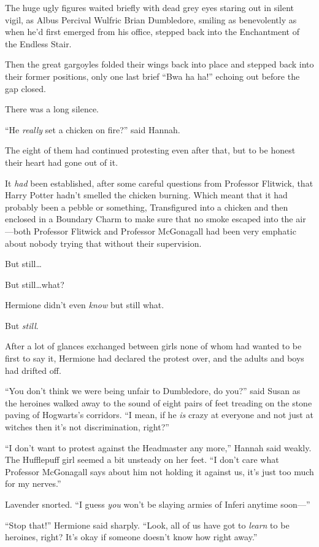 The huge ugly figures waited briefly with dead grey eyes staring out in silent vigil, as Albus Percival Wulfric Brian Dumbledore, smiling as benevolently as when he’d first emerged from his office, stepped back into the Enchantment of the Endless Stair.

Then the great gargoyles folded their wings back into place and stepped back into their former positions, only one last brief “Bwa ha ha!” echoing out before the gap closed.

There was a long silence.

“He \emph{really} set a chicken on fire?” said Hannah.

\later

The eight of them had continued protesting even after that, but to be honest their heart had gone out of it.

It \emph{had} been established, after some careful questions from Professor Flitwick, that Harry Potter hadn’t smelled the chicken burning. Which meant that it had probably been a pebble or something, Transfigured into a chicken and then enclosed in a Boundary Charm to make sure that no smoke escaped into the air—both Professor Flitwick and Professor McGonagall had been very emphatic about nobody trying that without their supervision.

But still…

But still…what?

Hermione didn’t even \emph{know} but still what.

But \emph{still}.

After a lot of glances exchanged between girls none of whom had wanted to be first to say it, Hermione had declared the protest over, and the adults and boys had drifted off.

“You don’t think we were being unfair to Dumbledore, do you?” said Susan as the heroines walked away to the sound of eight pairs of feet treading on the stone paving of Hogwarts’s corridors. “I mean, if he \emph{is} crazy at everyone and not just at witches then it’s not discrimination, right?”

“I don’t want to protest against the Headmaster any more,” Hannah said weakly. The Hufflepuff girl seemed a bit unsteady on her feet. “I don’t care what Professor McGonagall says about him not holding it against us, it’s just too much for my nerves.”

Lavender snorted. “I guess \emph{you} won’t be slaying armies of Inferi anytime soon—”

“Stop that!” Hermione said sharply. “Look, all of us have got to \emph{learn} to be heroines, right? It’s okay if someone doesn’t know how right away.”

